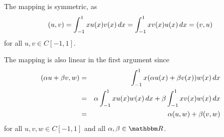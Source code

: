 \begin{solution}
\begin{enumerate}
The mapping is symmetric, as 
\[
(u,v) = \int_{-1}^1 xu(x) v(x) \, d x =  \int_{-1}^1 xv(x) u(x) \, d x = (v,u)
\]
for all $u,v\in C[-1,1]$.

The mapping is also linear in the first argument since
\begin{eqnarray*}
(\alpha u + \beta v, w) &=& \int_{-1}^1 x(\alpha u(x) + \beta v(x)) w(x) \, d x
\\
&=&  \alpha \int_{-1}^1 xu(x)w(x) \, dx +  \beta \int_{-1}^1 xv(x)w(x) \, dx
\\
&=& \alpha (u,w) + \beta (v,w)
\end{eqnarray*}
for all $u,v,w\in C[-1,1]$ and all $\alpha,\beta\in\R$.
\end{enumerate}
\end{solution}